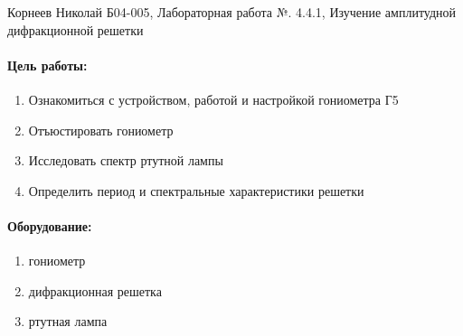 \documentclass[a4paper,12pt]{article}
\author{Бичина Марина 
группа Б04-005 1 курса ФЭФМ}
\title{}
\date{}
\begin{document}

\begin{center}
\begin{Large}
{Корнеев Николай Б04-005, Лабораторная работа №. 4.4.1, Изучение амплитудной дифракционной решетки}
\end{Large}
\end{center}
\paragraph{Цель работы: } 
\begin{enumerate}
\itemsep0em
\item Ознакомиться с устройством, работой и настройкой гониометра Г5
\item Отъюстировать гониометр
\item Исследовать спектр ртутной лампы
\item Определить период и спектральные характеристики решетки
\end{enumerate}
\paragraph{Оборудование:}
\begin{enumerate}
\itemsep0em
\item гониометр
\item дифракционная решетка
\item ртутная лампа
\end{enumerate}
\end{document}
